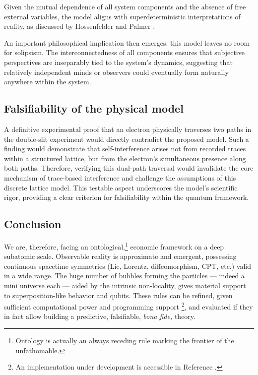 \documentclass[12pt,english]{article}
\begin{document}
Given the mutual dependence of all system components and the absence of free external variables, the model aligns with superdeterministic interpretations of reality, as discussed by Hossenfelder and Palmer \cite{hossenfelder2020rethinking}.

An important philosophical implication then emerges: this model leaves no room for solipsism. The interconnectedness of all components ensures that subjective perspectives are inseparably tied to the system's dynamics, suggesting that relatively independent minds or observers could eventually form naturally anywhere within the system.

\subsection{Falsifiability of the physical model}

A definitive experimental proof that an electron physically traverses two paths in the double-slit experiment would directly contradict the proposed model. Such a finding would demonstrate that self-interference arises not from recorded traces within a structured lattice, but from the electron's simultaneous presence along both paths. Therefore, verifying this dual-path traversal would invalidate the core mechanism of trace-based interference and challenge the assumptions of this discrete lattice model. This testable aspect underscores the model's scientific rigor, providing a clear criterion for falsifiability within the quantum framework.

\subsection{Conclusion}
We are, therefore, facing an ontological,\footnote{Ontology is actually an always receding rule marking the frontier of the unfathomable.} economic framework on a deep subatomic scale. Observable reality is approximate and emergent, possessing continuous spacetime symmetries (Lie, Lorentz, diffeomorphism, CPT, etc.) valid in a wide range. The huge number of bubbles forming the particles --- indeed a mini universe each --- aided by the intrinsic non-locality, gives material support to superposition-like behavior and qubits. These rules can be refined, given sufficient computational power and programming support \footnote{An implementation under development is accessible in Reference  \cite{af_neto}.}, and evaluated if they in fact allow building a predictive, falsifiable, \emph{bona fide,} theory.
\end{document}
